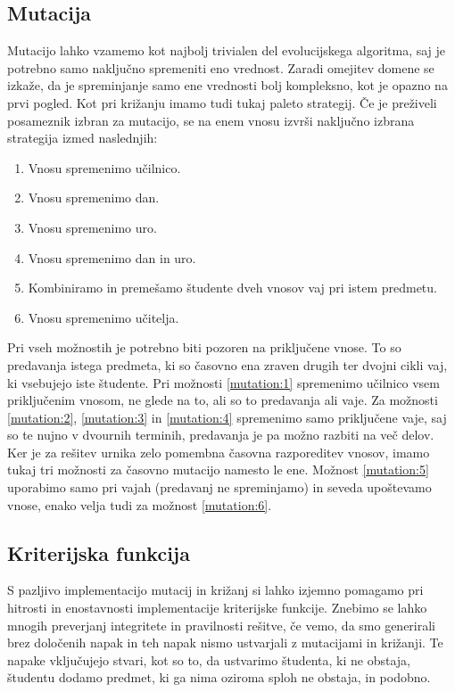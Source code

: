 \documentclass[a4paper,12pt]{book}
\begin{document}
\subsection{Mutacija}
Mutacijo lahko vzamemo kot najbolj trivialen del evolucijskega algoritma, saj je potrebno samo naključno spremeniti eno vrednost. Zaradi omejitev domene se izkaže, da je spreminjanje samo ene vrednosti bolj kompleksno, kot je opazno na prvi pogled. Kot pri križanju imamo tudi tukaj paleto strategij. Če je preživeli posameznik izbran za mutacijo, se na enem vnosu izvrši naključno izbrana strategija izmed naslednjih: 

\begin{enumerate}
\item \label{mutation:1} Vnosu spremenimo učilnico. 
\item \label{mutation:2} Vnosu spremenimo dan. 
\item \label{mutation:3} Vnosu spremenimo uro.
\item \label{mutation:4} Vnosu spremenimo dan in uro. 
\item \label{mutation:5} Kombiniramo in premešamo študente dveh vnosov vaj pri istem predmetu. 
\item \label{mutation:6} Vnosu spremenimo učitelja. 
\end{enumerate}

Pri vseh možnostih je potrebno biti pozoren na priključene vnose. To so predavanja istega predmeta, ki so časovno ena zraven drugih ter dvojni cikli vaj, ki vsebujejo iste študente. Pri možnosti \ref{mutation:1} spremenimo učilnico vsem priključenim vnosom, ne glede na to, ali so to predavanja ali vaje. Za možnosti \ref{mutation:2}, \ref{mutation:3} in \ref{mutation:4} spremenimo samo priključene vaje, saj so te nujno v dvournih terminih, predavanja je pa možno razbiti na več delov. Ker je za rešitev urnika zelo pomembna časovna razporeditev vnosov, imamo tukaj tri možnosti za časovno mutacijo namesto le ene. Možnost \ref{mutation:5} uporabimo samo pri vajah (predavanj ne spreminjamo) in seveda upoštevamo vnose, enako velja tudi za možnost \ref{mutation:6}. 

\subsection{Kriterijska funkcija}
S pazljivo implementacijo mutacij in križanj si lahko izjemno pomagamo pri hitrosti in enostavnosti implementacije kriterijske funkcije. Znebimo se lahko mnogih preverjanj integritete in pravilnosti rešitve, če vemo, da smo generirali brez določenih napak in teh napak nismo ustvarjali z mutacijami in križanji. Te napake vključujejo stvari, kot so to, da ustvarimo študenta, ki ne obstaja, študentu dodamo predmet, ki ga nima oziroma sploh ne obstaja, in podobno. 
\end{document}

